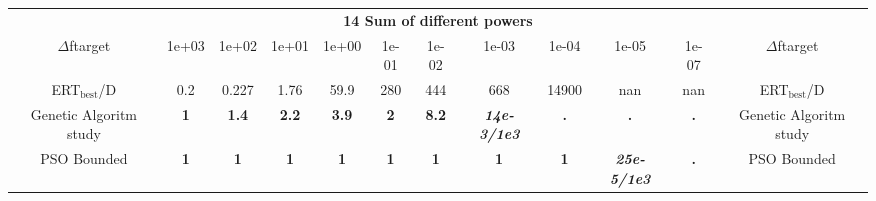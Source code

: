 \begin{tabular}{cccccccccccc}
 & \multicolumn{10}{c}{{\normalsize \textbf{14 Sum of different powers}}}\\
$\Delta$ftarget& 1e+03& 1e+02& 1e+01& 1e+00& 1e-01& 1e-02& 1e-03& 1e-04& 1e-05& 1e-07 & $\Delta$ftarget \\
ERT$_{\textrm{best}}$/D& 0.2& 0.227& 1.76& 59.9& 280& 444& 668& 14900& nan& nan & ERT$_{\textrm{best}}$/D \\
\hline
Genetic Algoritm study & \textbf{1} & \textbf{1.4} & \textbf{2.2} & \textbf{3.9} & \textbf{2} & \textbf{8.2} & \textbf{\textit{14e-3}\textit{/1e3}} & \textbf{.} & \textbf{.} & \textbf{.} & Genetic Algoritm study \cite{add_an_entry_for_Genetic Algoritm study_in_bbob.bib}\\
PSO Bounded & \textbf{1} & \textbf{1} & \textbf{1} & \textbf{1} & \textbf{1} & \textbf{1} & \textbf{1} & \textbf{1} & \textbf{\textit{25e-5}\textit{/1e3}} & \textbf{.} & PSO Bounded \cite{add_an_entry_for_PSO Bounded_in_bbob.bib}
\end{tabular}
